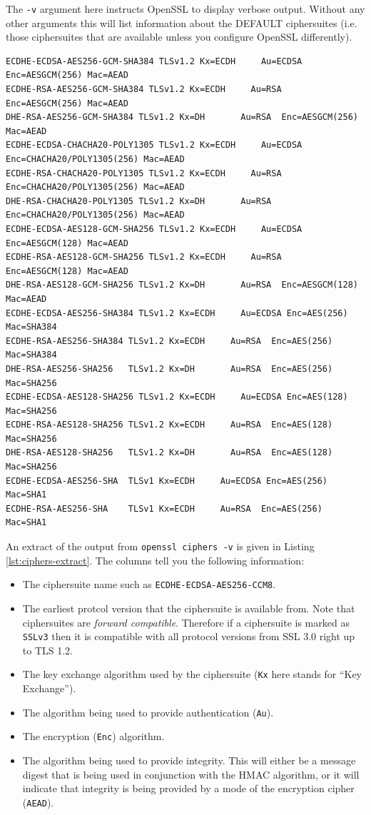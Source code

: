 The \lstinline!-v! argument here instructs OpenSSL to display verbose output.
Without any other arguments this will list information about the DEFAULT
ciphersuites (i.e. those ciphersuites that are available unless you configure
OpenSSL differently).

\begin{lstlisting}[float=tb,label=lst:ciphers-extract,caption=An
extract from \lstinline!openssl ciphers -v! output]
ECDHE-ECDSA-AES256-GCM-SHA384 TLSv1.2 Kx=ECDH     Au=ECDSA Enc=AESGCM(256) Mac=AEAD
ECDHE-RSA-AES256-GCM-SHA384 TLSv1.2 Kx=ECDH     Au=RSA  Enc=AESGCM(256) Mac=AEAD
DHE-RSA-AES256-GCM-SHA384 TLSv1.2 Kx=DH       Au=RSA  Enc=AESGCM(256) Mac=AEAD
ECDHE-ECDSA-CHACHA20-POLY1305 TLSv1.2 Kx=ECDH     Au=ECDSA Enc=CHACHA20/POLY1305(256) Mac=AEAD
ECDHE-RSA-CHACHA20-POLY1305 TLSv1.2 Kx=ECDH     Au=RSA  Enc=CHACHA20/POLY1305(256) Mac=AEAD
DHE-RSA-CHACHA20-POLY1305 TLSv1.2 Kx=DH       Au=RSA  Enc=CHACHA20/POLY1305(256) Mac=AEAD
ECDHE-ECDSA-AES128-GCM-SHA256 TLSv1.2 Kx=ECDH     Au=ECDSA Enc=AESGCM(128) Mac=AEAD
ECDHE-RSA-AES128-GCM-SHA256 TLSv1.2 Kx=ECDH     Au=RSA  Enc=AESGCM(128) Mac=AEAD
DHE-RSA-AES128-GCM-SHA256 TLSv1.2 Kx=DH       Au=RSA  Enc=AESGCM(128) Mac=AEAD
ECDHE-ECDSA-AES256-SHA384 TLSv1.2 Kx=ECDH     Au=ECDSA Enc=AES(256)  Mac=SHA384
ECDHE-RSA-AES256-SHA384 TLSv1.2 Kx=ECDH     Au=RSA  Enc=AES(256)  Mac=SHA384
DHE-RSA-AES256-SHA256   TLSv1.2 Kx=DH       Au=RSA  Enc=AES(256)  Mac=SHA256
ECDHE-ECDSA-AES128-SHA256 TLSv1.2 Kx=ECDH     Au=ECDSA Enc=AES(128)  Mac=SHA256
ECDHE-RSA-AES128-SHA256 TLSv1.2 Kx=ECDH     Au=RSA  Enc=AES(128)  Mac=SHA256
DHE-RSA-AES128-SHA256   TLSv1.2 Kx=DH       Au=RSA  Enc=AES(128)  Mac=SHA256
ECDHE-ECDSA-AES256-SHA  TLSv1 Kx=ECDH     Au=ECDSA Enc=AES(256)  Mac=SHA1
ECDHE-RSA-AES256-SHA    TLSv1 Kx=ECDH     Au=RSA  Enc=AES(256)  Mac=SHA1
\end{lstlisting}

An extract of the output from \lstinline!openssl ciphers -v! is given in 
Listing \ref{lst:ciphers-extract}. The columns tell you the following
information:
\begin{itemize}
\item The ciphersuite name such as \lstinline!ECDHE-ECDSA-AES256-CCM8!.
\item The earliest protcol version that the ciphersuite is available from. Note 
that ciphersuites are \emph{forward compatible}. Therefore if a ciphersuite is
marked as \lstinline!SSLv3! then it is compatible with all protocol versions 
from SSL 3.0 right up to TLS 1.2.
\item The key exchange algorithm used by the ciphersuite (\lstinline!Kx! here 
stands for ``Key Exchange'').
\item The algorithm being used to provide authentication (\lstinline!Au!).
\item The encryption (\lstinline!Enc!) algorithm.
\item The algorithm being used to provide integrity. This will either be a 
message digest that is being used in conjunction with the HMAC algorithm, or it
will indicate that integrity is being provided by a mode of the encryption 
cipher (\lstinline!AEAD!).
\end{itemize}

